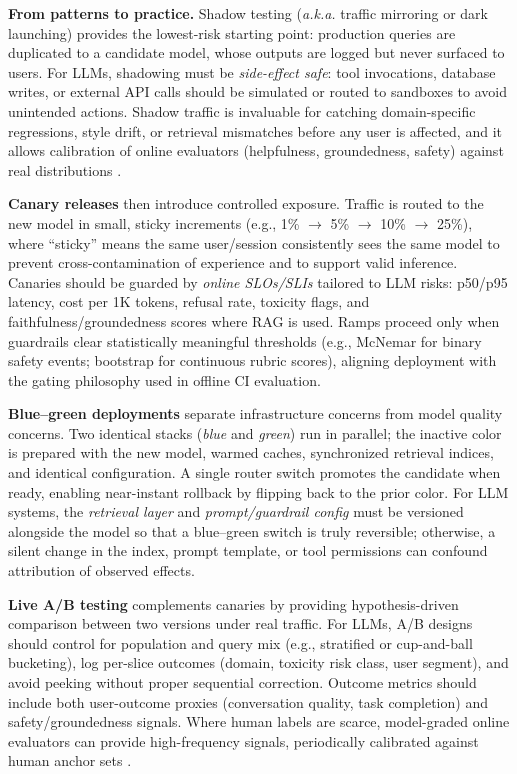 \noindent\textbf{From patterns to practice.}
Shadow testing (\emph{a.k.a.} traffic mirroring or dark launching) provides the lowest-risk starting point: production queries are duplicated to a candidate model, whose outputs are logged but never surfaced to users. For LLMs, shadowing must be \emph{side-effect safe}: tool invocations, database writes, or external API calls should be simulated or routed to sandboxes to avoid unintended actions. Shadow traffic is invaluable for catching domain-specific regressions, style drift, or retrieval mismatches before any user is affected, and it allows calibration of online evaluators (helpfulness, groundedness, safety) against real distributions \cite{mlflow_llm_eval,phoenix_rag,trulens}.

\noindent\textbf{Canary releases} then introduce controlled exposure. Traffic is routed to the new model in small, sticky increments (e.g., 1\% $\rightarrow$ 5\% $\rightarrow$ 10\% $\rightarrow$ 25\%), where ``sticky'' means the same user/session consistently sees the same model to prevent cross-contamination of experience and to support valid inference. Canaries should be guarded by \emph{online SLOs/SLIs} tailored to LLM risks: p50/p95 latency, cost per 1K tokens, refusal rate, toxicity flags, and faithfulness/groundedness scores where RAG is used. Ramps proceed only when guardrails clear statistically meaningful thresholds (e.g., McNemar for binary safety events; bootstrap for continuous rubric scores), aligning deployment with the gating philosophy used in offline CI evaluation.

\noindent\textbf{Blue--green deployments} separate infrastructure concerns from model quality concerns. Two identical stacks (\emph{blue} and \emph{green}) run in parallel; the inactive color is prepared with the new model, warmed caches, synchronized retrieval indices, and identical configuration. A single router switch promotes the candidate when ready, enabling near-instant rollback by flipping back to the prior color. For LLM systems, the \emph{retrieval layer} and \emph{prompt/guardrail config} must be versioned alongside the model so that a blue--green switch is truly reversible; otherwise, a silent change in the index, prompt template, or tool permissions can confound attribution of observed effects.

\noindent\textbf{Live A/B testing} complements canaries by providing hypothesis-driven comparison between two versions under real traffic. For LLMs, A/B designs should control for population and query mix (e.g., stratified or cup-and-ball bucketing), log per-slice outcomes (domain, toxicity risk class, user segment), and avoid peeking without proper sequential correction. Outcome metrics should include both user-outcome proxies (conversation quality, task completion) and safety/groundedness signals. Where human labels are scarce, model-graded online evaluators can provide high-frequency signals, periodically calibrated against human anchor sets \cite{phoenix_rag,trulens}.

